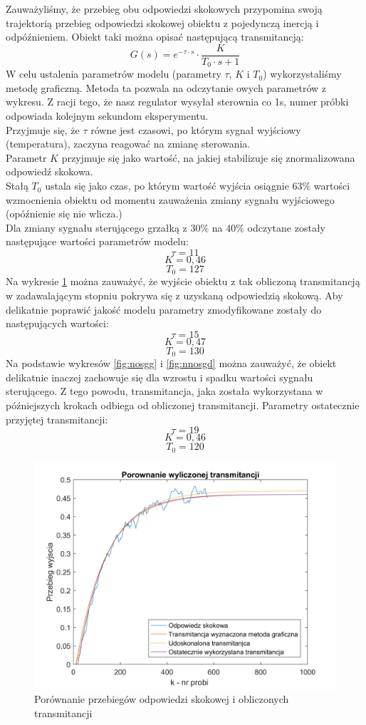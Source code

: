 \documentclass[12pt, a4paper]{article}
\begin{document}
Zauważyliśmy, że przebieg obu odpowiedzi skokowych przypomina swoją trajektorią przebieg odpowiedzi skokowej obiektu z pojedynczą inercją i odpóźnieniem. Obiekt taki można opisać następującą transmitancją:
\[G(s)=e^{-\tau \cdot s} \cdot \frac{K}{T_{0} \cdot s +1}\]
W celu ustalenia parametrów modelu (parametry $\tau$, $K$ i $T_{0}$) wykorzystaliśmy metodę graficzną. Metoda ta pozwala na odczytanie owych parametrów z wykresu. Z racji tego, że nasz regulator wysyłał sterownia co 1s, numer próbki odpowiada kolejnym sekundom eksperymentu. \\
Przyjmuje się, że $\tau$ równe jest czasowi, po którym sygnał wyjściowy (temperatura), zaczyna reagować na zmianę sterowania.\\
Parametr $K$ przyjmuje się jako wartość, na jakiej stabilizuje się znormalizowana odpowiedź skokowa.\\
Stałą $T_{0}$ ustala się jako czas, po którym wartość wyjścia osiągnie $63\%$ wartości wzmocnienia obiektu od momentu zauważenia zmiany sygnału wyjściowego (opóźnienie się nie wlicza.)\\ 
Dla zmiany sygnału sterującego grzałką z $30\%$ na $40\%$ odczytane zostały następujące wartości parametrów modelu:
\[\tau=11\]
\[K=0,46\]
\[T_{0}=127\]
Na wykresie \ref{fig:transmi_gglep} można zauważyć, że wyjście obiektu z tak obliczoną transmitancją w zadawalającym stopniu pokrywa się z uzyskaną odpowiedzią skokową. Aby delikatnie poprawić jakość modelu parametry zmodyfikowane zostały do następujących wartości:
\[\tau=15\]
\[K=0,47\]
\[T_{0}=130\]
Na podstawie wykresów \ref{fig:nosgg} i \ref{fig:nnosgd} można zauważyć, że obiekt delikatnie inaczej zachowuje się dla wzrostu i spadku wartości sygnału sterującego. Z tego powodu, transmitancja, jaka została wykorzystana w późniejszych krokach odbiega od obliczonej transmitancji. Parametry ostatecznie przyjętej transmitancji:
\[\tau=19\]
\[K=0,46\]
\[T_{0}=120\]
\begin{figure}[H]
	\centering
	\includegraphics[width=0.9\linewidth]{transmi_gglep}
	\caption{Porównanie przebiegów odpowiedzi skokowej i obliczonych transmitancji}
	\label{fig:transmi_gglep}
\end{figure}
\end{document}
